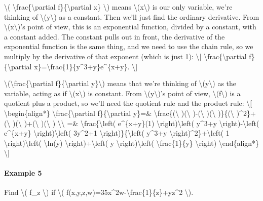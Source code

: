 \textbackslash{}( \textbackslash{}frac\{\textbackslash{}partial
f\}\{\textbackslash{}partial x\} \textbackslash{}) means
\textbackslash{}(x\textbackslash{}) is our only variable, we're thinking
of \textbackslash{}(y\textbackslash{}) as a constant. Then we'll just
find the ordinary derivative. From \textbackslash{}(x\textbackslash{})'s
point of view, this is an exponential function, divided by a constant,
with a constant added. The constant pulls out in front, the derivative
of the exponential function is the same thing, and we need to use the
chain rule, so we multiply by the derivative of that exponent (which is
just 1): \textbackslash{}{[}
\textbackslash{}frac\{\textbackslash{}partial
f\}\{\textbackslash{}partial
x\}=\textbackslash{}frac\{1\}\{y\^{}3+y\}e\^{}\{x+y\}.
\textbackslash{}{]}

\textbackslash{}(\textbackslash{}frac\{\textbackslash{}partial
f\}\{\textbackslash{}partial y\}\textbackslash{}) means that we're
thinking of \textbackslash{}(y\textbackslash{}) as the variable, acting
as if \textbackslash{}(x\textbackslash{}) is constant. From
\textbackslash{}(y\textbackslash{})'s point of view,
\textbackslash{}(f\textbackslash{}) is a quotient plus a product, so
we'll need the quotient rule and the product rule: \textbackslash{}{[}
\textbackslash{}begin\{align*\}
\textbackslash{}frac\{\textbackslash{}partial
f\}\{\textbackslash{}partial y\}=\&
\textbackslash{}frac\{(\textbackslash{} )(\textbackslash{}
)-(\textbackslash{} )(\textbackslash{} )\}\{(\textbackslash{}
)\^{}2\}+(\textbackslash{} )(\textbackslash{} )+(\textbackslash{}
)(\textbackslash{} ) \textbackslash{}\textbackslash{} =\&
\textbackslash{}frac\{\textbackslash{}left( e\^{}\{x+y\}(1)
\textbackslash{}right)\textbackslash{}left( y\^{}3+y
\textbackslash{}right)-\textbackslash{}left( e\^{}\{x+y\}
\textbackslash{}right)\textbackslash{}left( 3y\^{}2+1
\textbackslash{}right)\}\{\textbackslash{}left( y\^{}3+y
\textbackslash{}right)\^{}2\}+\textbackslash{}left( 1
\textbackslash{}right)\textbackslash{}left( \textbackslash{}ln(y)
\textbackslash{}right)+\textbackslash{}left( y
\textbackslash{}right)\textbackslash{}left(
\textbackslash{}frac\{1\}\{y\} \textbackslash{}right)
\textbackslash{}end\{align*\} \textbackslash{}{]}

\hypertarget{example-5}{%
\paragraph{Example 5}\label{example-5}}

Find \textbackslash{}( f\_z \textbackslash{}) if \textbackslash{}(
f(x,y,z,w)=35x\^{}2w-\textbackslash{}frac\{1\}\{z\}+yz\^{}2
\textbackslash{}).


